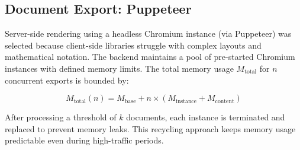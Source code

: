 \begin{table}[htbp]
\centering
{}
\vspace{6pt}
\caption{Comparison of LLM providers by context window, speed, and cost.}
\label{tab:llm_comparison}
\end{table}

\subsection{Document Export: Puppeteer}
\begin{table}[htbp]
\centering
{}
\vspace{6pt}
\caption{Comparison of PDF export methods.}
\label{tab:export_comparison}
\end{table}

Server-side rendering using a headless Chromium instance (via Puppeteer) was selected because client-side libraries struggle with complex layouts and mathematical notation. The backend maintains a pool of pre-started Chromium instances with defined memory limits. The total memory usage $M_{\text{total}}$ for $n$ concurrent exports is bounded by:

\begin{equation}
    M_{\text{total}}(n) = M_{\text{base}} + n \times (M_{\text{instance}} + M_{\text{content}})
\end{equation}

After processing a threshold of $k$ documents, each instance is terminated and replaced to prevent memory leaks. This recycling approach keeps memory usage predictable even during high-traffic periods.